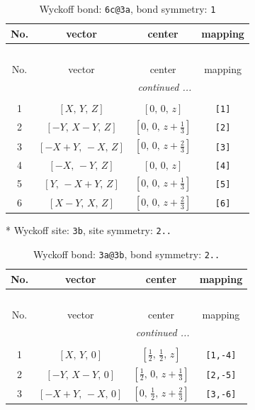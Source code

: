 \documentclass[fleqn,8pt]{jsarticle}
\begin{document}
\renewcommand{\arraystretch}{1.2}
\begin{longtable}{cccc}
\caption{Wyckoff bond: {\tt 6c@3a}, bond symmetry: {\tt 1}}
 \\
 \hline \hline
No. & vector & center & mapping \\ \hline \endfirsthead

\multicolumn{3}{l}{\tablename\ \thetable{}} \\
 \hline \hline
No. & vector & center & mapping \\ \hline \endhead

 \hline \hline
\multicolumn{3}{r}{\footnotesize\it continued ...} \\ \endfoot

 \hline \hline
\multicolumn{3}{r}{} \\ \endlastfoot

1 & $\left[ X,\, Y,\, Z \right]$ & $\left[ 0,\, 0,\, z \right]$ & {\tt [1]} \\ \hline
2 & $\left[ - Y,\, X - Y,\, Z \right]$ & $\left[ 0,\, 0,\, z + \frac{1}{3} \right]$ & {\tt [2]} \\ \hline
3 & $\left[ - X + Y,\, - X,\, Z \right]$ & $\left[ 0,\, 0,\, z + \frac{2}{3} \right]$ & {\tt [3]} \\ \hline
4 & $\left[ - X,\, - Y,\, Z \right]$ & $\left[ 0,\, 0,\, z \right]$ & {\tt [4]} \\ \hline
5 & $\left[ Y,\, - X + Y,\, Z \right]$ & $\left[ 0,\, 0,\, z + \frac{1}{3} \right]$ & {\tt [5]} \\ \hline
6 & $\left[ X - Y,\, X,\, Z \right]$ & $\left[ 0,\, 0,\, z + \frac{2}{3} \right]$ & {\tt [6]} \\
\end{longtable}
* Wyckoff site: {\tt 3b}, site symmetry: {\tt 2..}
\renewcommand{\arraystretch}{1.2}
\begin{longtable}{cccc}
\caption{Wyckoff bond: {\tt 3a@3b}, bond symmetry: {\tt 2..}}
 \\
 \hline \hline
No. & vector & center & mapping \\ \hline \endfirsthead

\multicolumn{3}{l}{\tablename\ \thetable{}} \\
 \hline \hline
No. & vector & center & mapping \\ \hline \endhead

 \hline \hline
\multicolumn{3}{r}{\footnotesize\it continued ...} \\ \endfoot

 \hline \hline
\multicolumn{3}{r}{} \\ \endlastfoot

1 & $\left[ X,\, Y,\, 0 \right]$ & $\left[ \frac{1}{2},\, \frac{1}{2},\, z \right]$ & {\tt [1,-4]} \\ \hline
2 & $\left[ - Y,\, X - Y,\, 0 \right]$ & $\left[ \frac{1}{2},\, 0,\, z + \frac{1}{3} \right]$ & {\tt [2,-5]} \\ \hline
3 & $\left[ - X + Y,\, - X,\, 0 \right]$ & $\left[ 0,\, \frac{1}{2},\, z + \frac{2}{3} \right]$ & {\tt [3,-6]} \\
\end{longtable}
\end{document}
